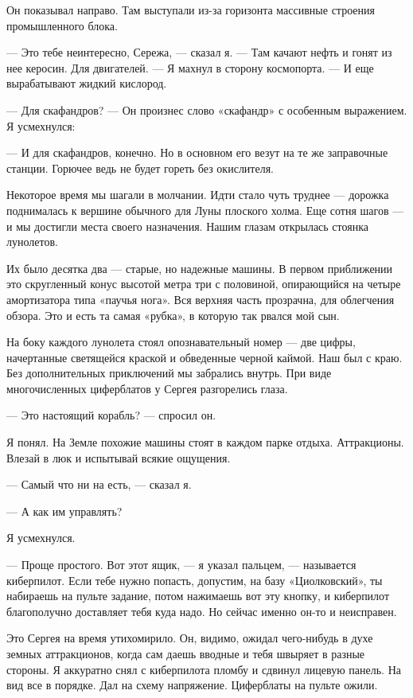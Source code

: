 \documentclass[11pt,a4paper,oneside]{article}
\begin{document}
Он показывал направо. Там выступали из-за горизонта массивные строения промышленного блока.

— Это тебе неинтересно, Сережа, — сказал я. — Там качают нефть и гонят из нее керосин. Для двигателей. — Я махнул в сторону космопорта. — И еще вырабатывают жидкий кислород.

— Для скафандров? — Он произнес слово «скафандр» с особенным выражением. Я усмехнулся:

— И для скафандров, конечно. Но в основном его везут на те же заправочные станции. Горючее ведь не будет гореть без окислителя.

Некоторое время мы шагали в молчании. Идти стало чуть труднее — дорожка поднималась к вершине обычного для Луны плоского холма. Еще сотня шагов — и мы достигли места своего назначения. Нашим глазам открылась стоянка лунолетов.

Их было десятка два — старые, но надежные машины. В первом приближении это скругленный конус высотой метра три с половиной, опирающийся на четыре амортизатора типа «паучья нога». Вся верхняя часть прозрачна, для облегчения обзора. Это и есть та самая «рубка», в которую так рвался мой сын.

На боку каждого лунолета стоял опознавательный номер — две цифры, начертанные светящейся краской и обведенные черной каймой. Наш был с краю. Без дополнительных приключений мы забрались внутрь. При виде многочисленных циферблатов у Сергея разгорелись глаза.

— Это настоящий корабль? — спросил он.

Я понял. На Земле похожие машины стоят в каждом парке отдыха. Аттракционы. Влезай в люк и испытывай всякие ощущения.

— Самый что ни на есть, — сказал я.

— А как им управлять?

Я усмехнулся.

— Проще простого. Вот этот ящик, — я указал пальцем, — называется киберпилот. Если тебе нужно попасть, допустим, на базу «Циолковский», ты набираешь на пульте задание, потом нажимаешь вот эту кнопку, и киберпилот благополучно доставляет тебя куда надо. Но сейчас именно он-то и неисправен.

Это Сергея на время утихомирило. Он, видимо, ожидал чего-нибудь в духе земных аттракционов, когда сам даешь вводные и тебя швыряет в разные стороны. Я аккуратно снял с киберпилота пломбу и сдвинул лицевую панель. На вид все в порядке. Дал на схему напряжение. Циферблаты на пульте ожили.
\end{document}
